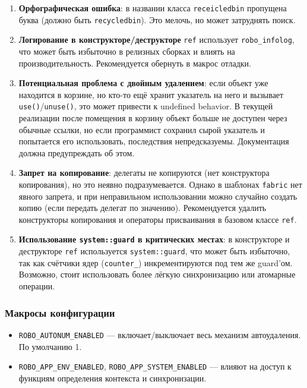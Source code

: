 \documentclass[a4paper,12pt]{article}
\begin{document}
\begin{enumerate}
    \item \textbf{Орфографическая ошибка}: в названии класса \texttt{receicledbin} пропущена буква (должно быть \texttt{recycledbin}). Это мелочь, но может затруднять поиск.
    \item \textbf{Логирование в конструкторе/деструкторе} \texttt{ref} использует \texttt{robo\_infolog}, что может быть избыточно в релизных сборках и влиять на производительность. Рекомендуется обернуть в макрос отладки.
    \item \textbf{Потенциальная проблема с двойным удалением}: если объект уже находится в корзине, но кто-то ещё хранит указатель на него и вызывает \texttt{use()}/\texttt{unuse()}, это может привести к undefined behavior. В текущей реализации после помещения в корзину объект больше не доступен через обычные ссылки, но если программист сохранил сырой указатель и попытается его использовать, последствия непредсказуемы. Документация должна предупреждать об этом.
    \item \textbf{Запрет на копирование}: делегаты не копируются (нет конструктора копирования), но это неявно подразумевается. Однако в шаблонах \texttt{fabric} нет явного запрета, и при неправильном использовании можно случайно создать копию (если передать делегат по значению). Рекомендуется удалить конструкторы копирования и операторы присваивания в базовом классе \texttt{ref}.
    \item \textbf{Использование \texttt{system::guard} в критических местах}: в конструкторе и деструкторе \texttt{ref} используется \texttt{system::guard}, что может быть избыточно, так как счётчики ядер (\texttt{counter\_}) инкрементируются под тем же guard'ом. Возможно, стоит использовать более лёгкую синхронизацию или атомарные операции.
\end{enumerate}

\subsubsection{Макросы конфигурации}

\begin{itemize}
    \item \texttt{ROBO\_AUTONUM\_ENABLED} — включает/выключает весь механизм автоудаления. По умолчанию 1.
    \item \texttt{ROBO\_APP\_ENV\_ENABLED}, \texttt{ROBO\_APP\_SYSTEM\_ENABLED} — влияют на доступ к функциям определения контекста и синхронизации.
\end{itemize}
\end{document}
